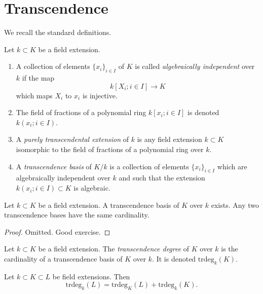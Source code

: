 \section{Transcendence}
\label{section-transcendence}

\noindent
We recall the standard definitions.

\begin{definition}
\label{definition-transcendence}
Let $k \subset K$ be a field extension.
\begin{enumerate}
\item A collection of elements $\{x_i\}_{i \in I}$ of $K$ is called
{\it algebraically independent} over $k$ if the map
$$
k[X_i; i\in I] \longrightarrow K
$$
which maps $X_i$ to $x_i$ is injective.
\item The field of fractions of a polynomial ring
$k[x_i; i \in I]$ is denoted $k(x_i; i\in I)$.
\item A {\it purely transcendental extension} of $k$ is any
field extension $k \subset K$ isomorphic to the field of
fractions of a polynomial ring over $k$.
\item A {\it transcendence basis} of $K/k$ is a 
collection of elements $\{x_i\}_{i \in I}$ which are
algebraically independent over $k$ and such that
the extension $k(x_i; i\in I) \subset K$ is algebraic.
\end{enumerate}
\end{definition}

\begin{lemma}
\label{lemma-transcendence-degree}
Let $k \subset K$ be a field extension.
A transcendence basis of $K$ over $k$ exists.
Any two transcendence bases have the same cardinality.
\end{lemma}

\begin{proof}
Omitted. Good exercise.
\end{proof}

\begin{definition}
\label{definition-transcendence-degree}
Let $k \subset K$ be a field extension.
The {\it transcendence degree} of $K$ over $k$ is
the cardinality of a transcendence basis of $K$ over $k$.
It is denoted $\text{trdeg}_k(K)$.
\end{definition}

\begin{lemma}
\label{lemma-transcendence-degree-tower}
Let $k \subset K \subset L$ be field extensions.
Then
$$
\text{trdeg}_k(L) = 
\text{trdeg}_K(L) +
\text{trdeg}_k(K).
$$
\end{lemma}

